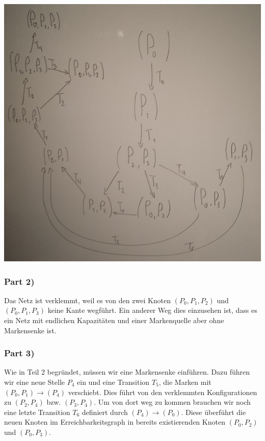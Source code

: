 \documentclass[10pt,a4paper]{article}
\begin{document}
\includegraphics[width=\textwidth]{sheet-6/exercise-1-2-1}

\subsubsection*{Part 2)}

Das Netz ist verklemmt, weil es von den zwei Knoten $(P_{0}, P_{1}, P_{2})$ und $(P_{0}, P_{1}, P_{3})$ keine Kante wegführt.
Ein anderer Weg dies einzusehen ist, dass es ein Netz mit endlichen Kapazitäten und einer Markenquelle aber ohne Markensenke ist.

\subsubsection*{Part 3)}

Wie in Teil 2 begründet, müssen wir eine Markensenke einführen.
Dazu führen wir eine neue Stelle $P_{4}$ ein und eine Transition $T_{5}$, die Marken mit $(P_{0}, P_{1}) \rightarrow (P_{4})$ verschiebt.
Dies führt von den verklemmten Konfigurationen zu $(P_{2}, P_{4})$ bzw. $(P_{3}, P_{4})$.
Um von dort weg zu kommen brauchen wir noch eine letzte Transition $T_{6}$ definiert durch $(P_{4}) \rightarrow (P_{0})$.
Diese überführt die neuen Knoten im Erreichbarkeitsgraph in bereits existierenden Knoten $(P_{0}, P_{2})$ und $(P_{0}, P_{3})$.
\end{document}
